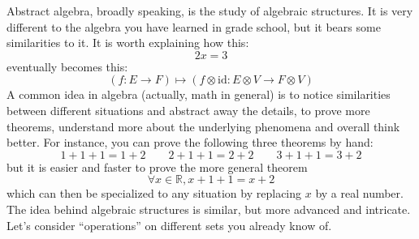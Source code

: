 \documentclass{book}
\newcommand{\id}{\mathrm{id}}
\newcommand{\R}{\mathbb{R}}
\theoremstyle{plain}
\theoremstyle{definition}
\theoremstyle{remark}
\begin{document}
Abstract algebra, broadly speaking, is the study of algebraic structures. It is very different to the algebra you have learned in grade school, but it bears some similarities to it. It is worth explaining how this:
\[2x = 3\]
eventually becomes this:
\[(f : E \to F) \mapsto (f \otimes \id : E \otimes V \to F \otimes V)\]
A common idea in algebra (actually, math in general) is to notice similarities between different situations and abstract away the details, to prove more theorems, understand more about the underlying phenomena and overall think better. For instance, you can prove the following three theorems by hand:
\[1 + 1 + 1 = 1 + 2 \qquad 2 + 1 + 1 = 2 + 2 \qquad 3 + 1 + 1 = 3 + 2\]
but it is easier and faster to prove the more general theorem
\[\forall x \in \R, x + 1 + 1 = x + 2\]
which can then be specialized to any situation by replacing $x$ by a real number. The idea behind algebraic structures is similar, but more advanced and intricate. \\
Let's consider ``operations'' on different sets you already know of.
\end{document}
